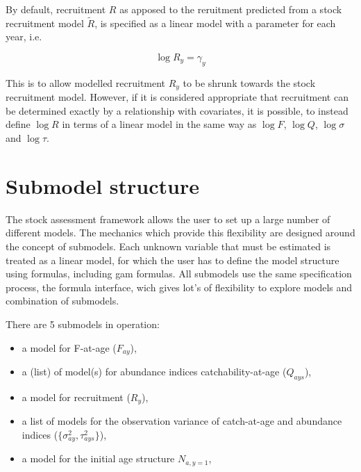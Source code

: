 \documentclass[a4paper,english,11pt]{article}
\begin{document}

By default, recruitment $R$ as apposed to the reruitment predicted from a stock recruitment model $\tilde{R}$, is specified as a linear model with a parameter for each year, i.e.

$$\log R_y = \gamma_y$$

This is to allow modelled recruitment $R_y$ to be shrunk towards the stock recruitment model. However, if it is considered appropriate that recruitment can be determined exactly by a relationship with covariates, it is possible, to instead define $\log R$ in terms of a linear model in the same way as $\log F$, $\log Q$, $\log \sigma$ and $\log \tau$.  %



\section{Submodel structure}\label{sec:submod}

The \aFa stock assessment framework allows the user to set up a large number of different models. The mechanics which provide this flexibility are designed around the concept of submodels. Each unknown variable that must be estimated is treated as a linear model, for which the user has to define the model structure using \R formulas, including \href{http://cran.r-project.org/web/packages/mgcv/index.html}{} gam formulas. All submodels use the same specification process, the \R formula interface, wich gives lot's of flexibility to explore models and combination of submodels.

There are 5 submodels in operation:
\begin{itemize}
  \item a model for F-at-age ($F_{ay}$),
  \item a (list) of model(s) for abundance indices catchability-at-age ($Q_{ays}$),
  \item a model for recruitment ($R_y$),
  \item a list of models for the observation variance of catch-at-age and abundance indices ($\{\sigma^2_{ay}, \tau^2_{ays}\}$),
  \item a model for the initial age structure $N_{a,y=1}$,
\end{itemize}
\end{document}
